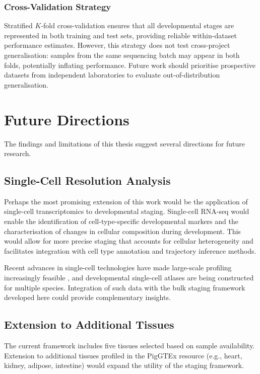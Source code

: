 \subsubsection{Cross-Validation Strategy}

Stratified $K$-fold cross-validation ensures that all developmental stages are represented in both training and test sets, providing reliable within-dataset performance estimates. However, this strategy does not test cross-project generalisation: samples from the same sequencing batch may appear in both folds, potentially inflating performance. Future work should prioritise prospective datasets from independent laboratories to evaluate out-of-distribution generalisation.


\section{Future Directions}\label{sec:discussion:future}

The findings and limitations of this thesis suggest several directions for future research.

\subsection{Single-Cell Resolution Analysis}

Perhaps the most promising extension of this work would be the application of single-cell transcriptomics to developmental staging. Single-cell RNA-seq would enable the identification of cell-type-specific developmental markers and the characterisation of changes in cellular composition during development. This would allow for more precise staging that accounts for cellular heterogeneity and facilitates integration with cell type annotation and trajectory inference methods.

Recent advances in single-cell technologies have made large-scale profiling increasingly feasible \parencite{schaum_single-cell_2018}, and developmental single-cell atlases are being constructed for multiple species. Integration of such data with the bulk staging framework developed here could provide complementary insights.

\subsection{Extension to Additional Tissues}

The current framework includes five tissues selected based on sample availability. Extension to additional tissues profiled in the PigGTEx resource (e.g., heart, kidney, adipose, intestine) would expand the utility of the staging framework.

